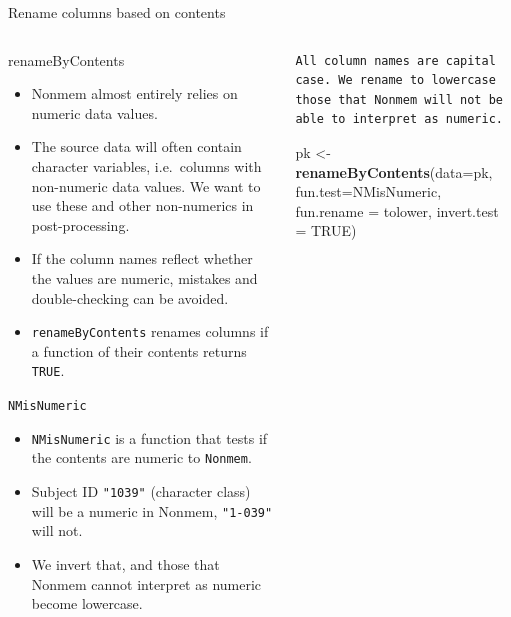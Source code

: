 \documentclass[
  8pt,
  ignorenonframetext,
  aspectratio=169]{beamer}
\newenvironment{Shaded}{\begin{snugshade}}{\end{snugshade}}
\newcommand{\DataTypeTok}[1]{\textcolor[rgb]{0.13,0.29,0.53}{#1}}
\newcommand{\KeywordTok}[1]{\textcolor[rgb]{0.13,0.29,0.53}{\textbf{#1}}}
\newcommand{\NormalTok}[1]{#1}
\newcommand{\OtherTok}[1]{\textcolor[rgb]{0.56,0.35,0.01}{#1}}
\newcommand{\StringTok}[1]{\textcolor[rgb]{0.31,0.60,0.02}{#1}}
\providecommand{\tightlist}{%
  \setlength{\itemsep}{0pt}\setlength{\parskip}{0pt}}
\begin{document}
\begin{frame}[fragile]{Rename columns based on contents}
\protect\hypertarget{rename-columns-based-on-contents}{}
\begin{columns}[T]
\begin{column}{0.48\textwidth}
\begin{block}{renameByContents}
\protect\hypertarget{renamebycontents}{}
\begin{itemize}
\tightlist
\item
  Nonmem almost entirely relies on numeric data values.
\item
  The source data will often contain character variables, i.e.~columns
  with non-numeric data values. We want to use these and other
  non-numerics in post-processing.
\item
  If the column names reflect whether the values are numeric, mistakes
  and double-checking can be avoided.
\item
  \texttt{renameByContents} renames columns if a function of their
  contents returns \texttt{TRUE}.
\end{itemize}
\end{block}

\begin{block}{\texttt{NMisNumeric}}
\protect\hypertarget{nmisnumeric}{}
\begin{itemize}
\tightlist
\item
  \texttt{NMisNumeric} is a function that tests if the contents are
  numeric to \texttt{Nonmem}.
\item
  Subject ID \texttt{"1039"} (character class) will be a numeric in
  Nonmem, \texttt{"1-039"} will not.
\item
  We invert that, and those that Nonmem cannot interpret as numeric
  become lowercase.
\end{itemize}
\end{block}
\end{column}

\begin{column}{0.48\textwidth}
\begin{verbatim}
All column names are capital case. We rename to lowercase those that Nonmem will not be able to interpret as numeric.
\end{verbatim}

\footnotesize

\begin{Shaded}
\begin{Highlighting}[]
\NormalTok{pk \textless{}{-}}\StringTok{ }\KeywordTok{renameByContents}\NormalTok{(}\DataTypeTok{data=}\NormalTok{pk,}
                       \DataTypeTok{fun.test=}\NormalTok{NMisNumeric,}
                       \DataTypeTok{fun.rename =}\NormalTok{ tolower,}
                       \DataTypeTok{invert.test =} \OtherTok{TRUE}\NormalTok{)}
\end{Highlighting}
\end{Shaded}


\end{column}
\end{columns}
\end{frame}
\end{document}
